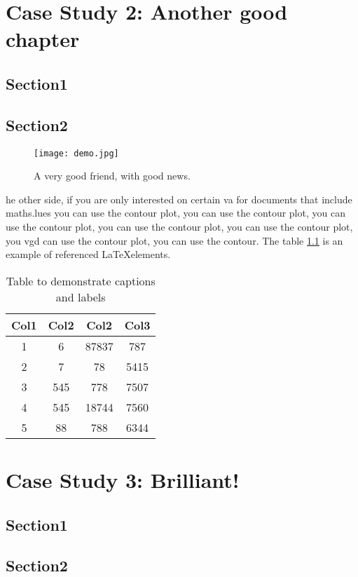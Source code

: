 \chapter{Case Study 2: Another good chapter}
\section{Section1}
\section{Section2}

\begin{figure}[t]
\texttt{[image: demo.jpg]}
\centering
  \caption{A very good friend, with good news.}
    \label{fig:demo}
\end{figure}
he other side, if you are only interested on
certain va for documents that include \gls{maths}.lues you can use the contour plot, you 
can use the contour plot, you can use the contour 
plot, you can use the contour plot, you can use 
the contour plot, you \acrshort{vgd} can use the contour plot, 
you can use the contour.  The table \ref{table:1} is an example of referenced \LaTeX elements.
 
\begin{table}[h!]
\centering
\begin{tabular}{||c c c c||} 
 \hline
 Col1 & Col2 & Col2 & Col3 \\ [0.5ex] 
 \hline\hline
 1 & 6 & 87837 & 787 \\ 
 2 & 7 & 78 & 5415 \\
 3 & 545 & 778 & 7507 \\
 4 & 545 & 18744 & 7560 \\
 5 & 88 & 788 & 6344 \\ [1ex] 
 \hline
\end{tabular}
\caption{Table to demonstrate captions and labels}
\label{table:1}
\end{table}

\chapter{Case Study 3: Brilliant!}
\section{Section1}
\section{Section2}